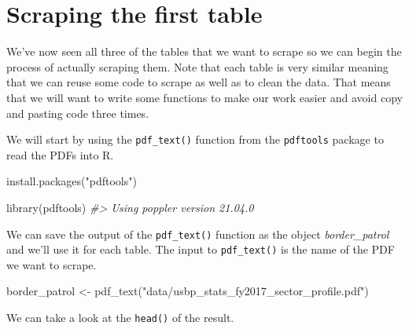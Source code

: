 \documentclass[
]{krantz}
\makeatletter
\newenvironment{Shaded}{\begin{snugshade}}{\end{snugshade}}
\newcommand{\CommentTok}[1]{\textcolor[rgb]{0.37,0.37,0.37}{\textit{#1}}}
\newcommand{\FunctionTok}[1]{\textcolor[rgb]{0,0,0}{#1}}
\newcommand{\NormalTok}[1]{#1}
\newcommand{\OtherTok}[1]{\textcolor[rgb]{0.37,0.37,0.37}{#1}}
\newcommand{\StringTok}[1]{\textcolor[rgb]{0.5,0.5,0.5}{#1}}
\newenvironment{kframe}{%
\medskip{}
\setlength{\fboxsep}{.8em}
 \def\at@end@of@kframe{}%
 \ifinner\ifhmode%
  \def\at@end@of@kframe{\end{minipage}}%
  \begin{minipage}{\columnwidth}%
 \fi\fi%
 \def\FrameCommand##1{\hskip\@totalleftmargin \hskip-\fboxsep
 \colorbox{shadecolor}{##1}\hskip-\fboxsep
     \hskip-\linewidth \hskip-\@totalleftmargin \hskip\columnwidth}%
 \MakeFramed {\advance\hsize-\width
   \@totalleftmargin\z@ \linewidth\hsize
   \@setminipage}}%
 {\par\unskip\endMakeFramed%
 \at@end@of@kframe}
\renewenvironment{Shaded}{\begin{kframe}}{\end{kframe}}
\makeatother
\begin{document}
\hypertarget{scraping-the-first-table}{%
\section{Scraping the first table}\label{scraping-the-first-table}}

We've now seen all three of the tables that we want to scrape so we can begin the process of actually scraping them. Note that each table is very similar meaning that we can reuse some code to scrape as well as to clean the data. That means that we will want to write some functions to make our work easier and avoid copy and pasting code three times.

We will start by using the \texttt{pdf\_text()} function from the \texttt{pdftools} package to read the PDFs into R.

\begin{Shaded}
\begin{Highlighting}[]
\FunctionTok{install.packages}\NormalTok{(}\StringTok{"pdftools"}\NormalTok{)}
\end{Highlighting}
\end{Shaded}

\begin{Shaded}
\begin{Highlighting}[]
\FunctionTok{library}\NormalTok{(pdftools)}
\CommentTok{\#\textgreater{} Using poppler version 21.04.0}
\end{Highlighting}
\end{Shaded}

We can save the output of the \texttt{pdf\_text()} function as the object \emph{border\_patrol} and we'll use it for each table. The input to \texttt{pdf\_text()} is the name of the PDF we want to scrape.

\begin{Shaded}
\begin{Highlighting}[]
\NormalTok{border\_patrol }\OtherTok{\textless{}{-}} \FunctionTok{pdf\_text}\NormalTok{(}\StringTok{"data/usbp\_stats\_fy2017\_sector\_profile.pdf"}\NormalTok{)}
\end{Highlighting}
\end{Shaded}

We can take a look at the \texttt{head()} of the result.
\end{document}
